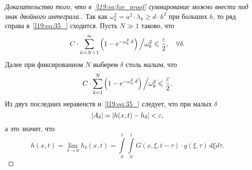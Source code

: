 \begin{proof}[Доказательство того, что в~\eqref{l19:eq:for_proof} суммирование можно внести под знак двойного интеграла.]
	Так как $\omega_k^2=a^2\cdot\lambda_k\geqslant d\cdot k^2$ при больших $k$, то ряд справа в~\eqref{l19:eq:35_} сходится. Пусть $N\gg1$ таково, что 
	\begin{equation*}
		C\cdot\sum\limits_{k=N+1}^{\infty}\left(1-e^{-\omega_k^2\cdot\delta}\right)\Big/\omega_k^2\leqslant\frac{\varepsilon}{2},\quad\forall\delta.
	\end{equation*}
	Далее при фиксированном $N$ выберем $\delta$ столь малым, что
	\begin{equation*}
		C\cdot\sum\limits_{k=1}^{N}\left(1-e^{-\omega_k^2\cdot\delta}\right)\Big/\omega_k^2\leqslant\frac{\varepsilon}{2}.
	\end{equation*}
	Из двух последних неравенств и~\eqref{l19:eq:35_} следует, что при малых $\delta$
	\begin{equation*}
		|A_{\delta}|=|h(x,t)-h_{\delta}|<\varepsilon,
	\end{equation*}
	а это значит, что 
	\begin{equation*}
		h(x,t)=\lim\limits_{\delta\to0}h_{\delta}(x,t)=\int\limits_0^t\int\limits_0^l G(x,\xi,t-\tau)\cdot g(\xi,\tau)\,d\xi d\tau.
	\end{equation*} 
\end{proof}